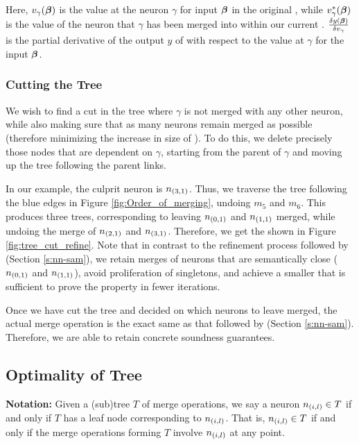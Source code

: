 Here, 
$v_{\gamma}(\boldsymbol{\beta})$ is the value at the neuron $\gamma$ for input
$\boldsymbol{\beta}$ in the original \cnc, while $v^{*}_{\gamma}(\boldsymbol{\beta})$ is the
value of the neuron that $\gamma$ has been merged into within our current \abs.
$\frac{\delta y(\boldsymbol{\beta})}{\delta v_{\gamma}}$ is the partial derivative of
the output $y$ of \cnc with respect to the value at $\gamma$ for the input
$\boldsymbol{\beta}$.

\subsubsection{Cutting the Tree}

We wish to find a cut in the tree where $\gamma$ is not merged with any other
neuron, while also making sure that as many neurons remain merged as possible
(therefore minimizing the increase in size of \abs). To do this, we delete
precisely those nodes that are dependent on $\gamma$, starting from the parent
of $\gamma$ and moving up the tree following the parent links.

In our example, the culprit neuron is $n_{(3,1)}$. Thus, we traverse the tree
following the blue edges in Figure \ref{fig:Order_of_merging}, undoing $m_5$ and
$m_6$. This produces three trees, corresponding to leaving $n_{(0,1)}$ and
$n_{(1,1)}$ merged, while undoing the merge of $n_{(2,1)}$ and $n_{(3,1)}$.
Therefore, we get the \abs shown in Figure \ref{fig:tree_cut_refine}. Note
that in contrast to the refinement process followed by \cite{cegar-nn} (Section
\ref{s:nn-sam}), we retain merges of neurons that are semantically close
($n_{(0,1)}$ and $n_{(1,1)}$), avoid
proliferation of singletons, and achieve a smaller \abs that is sufficient to
prove the property in fewer iterations.

Once we have cut the tree and decided on which neurons to leave merged, the
actual merge operation is the exact same as that followed by \cite{cegar-nn}
(Section \ref{s:nn-sam}). Therefore, we are able to retain concrete soundness
guarantees.



\subsection{Optimality of Tree}
\label{s:optimal-tree}

\textbf{Notation:} Given a (sub)tree $T$ of
merge operations, we say a neuron $n_{(i,l)} \in T$ if and only if $T$ has a
leaf node corresponding to $n_{(i,l)}$. That is, $n_{(i,l)} \in T$ if and only
if the merge operations forming $T$ involve $n_{(i,l)}$ at any point.


